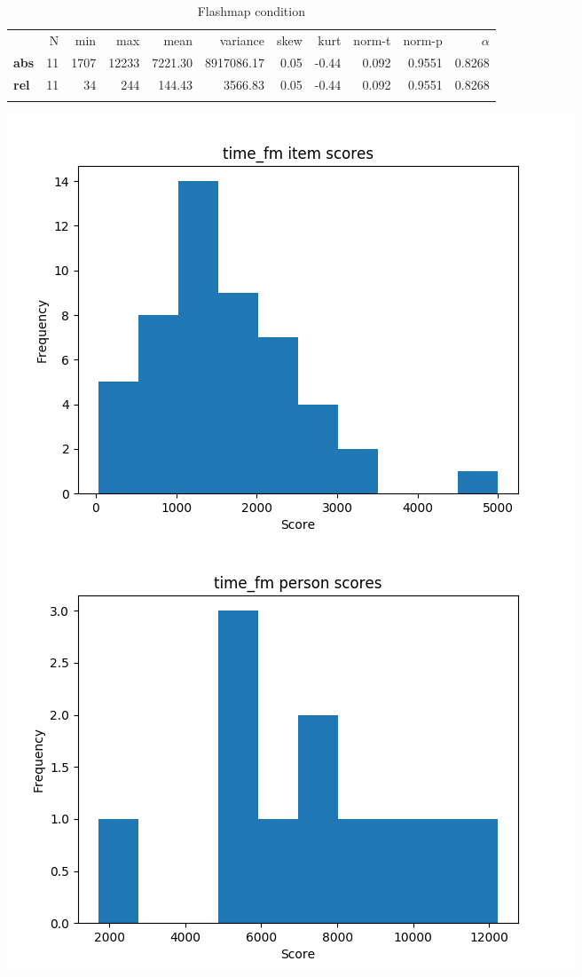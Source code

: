 \begin{longtable}[c]{@{}lrrrrrrrrrr@{}}
\caption{Flashmap condition}
\endfirsthead
\toprule\addlinespace
& N & min & max & mean & variance & skew & kurt & norm-t &
norm-p & $\alpha$
\\\addlinespace
\midrule
\textbf{abs} & 11 & 1707 & 12233 & 7221.30 & 8917086.17 & 0.05 & -0.44 &
0.092 & 0.9551 & 0.8268
\\\addlinespace
\textbf{rel} & 11 & 34 & 244 & 144.43 & 3566.83 & 0.05 & -0.44 & 0.092 &
0.9551 & 0.8268
\\\addlinespace
\bottomrule
\end{longtable}

\includegraphics{img/time_fm_diff.png} \includegraphics{img/time_fm_abil.png}


